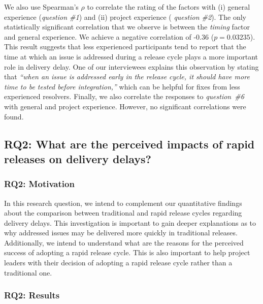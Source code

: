 \begin{sloppypar}
We also use Spearman's $\rho$ to correlate the rating of the factors with (i)
general experience ({\em question \#1}) and (ii) project experience ({\em
question \#2}). The only statistically significant correlation that we observe is
between the {\em timing} factor and general experience. We achieve a negative
correlation of -0.36 ($p=0.03235$). This result suggests that less
experienced participants tend to report that the time at which an issue is
addressed during a release cycle plays a more important role in delivery
delay. One of our interviewees explains this observation by stating that {\em
``when an issue is addressed early in the release cycle, it should have more
time to be tested before integration,''} which can be helpful for fixes
from less experienced resolvers. Finally, we also correlate the responses
to {\em question~\#6} with general and project experience. However, no
significant correlations were found.\\
\end{sloppypar}


\subsection{RQ2: What are the perceived impacts of rapid
releases on delivery delays?}\label{ch5:rq2}

\subsubsection*{RQ2: Motivation}

In this research question, we intend to complement our quantitative findings
about the comparison between traditional and rapid release cycles regarding
delivery delays. This investigation is important to gain deeper explanations as
to why addressed issues may be delivered more quickly in traditional releases.
Additionally, we intend to understand what are the reasons for the perceived
success of adopting a rapid release cycle. This is also important to help
project leaders with their decision of adopting a rapid release cycle rather
than a traditional one. \\

\subsubsection*{RQ2: Results}

